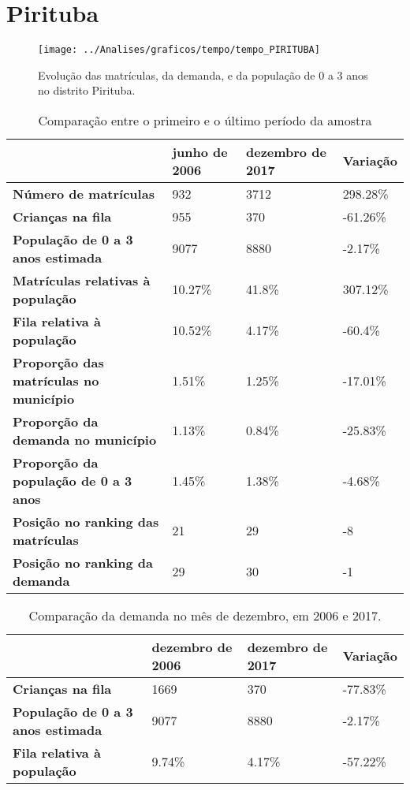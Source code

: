 \section{Pirituba}
\begin{figure}[H]
\centering
\texttt{[image: ../Analises/graficos/tempo/tempo\_PIRITUBA]}
\caption{Evolução das matrículas, da demanda, e da população de 0 a 3 anos no distrito Pirituba.}
\end{figure}
\begin{table}[H]
\begin{tabular}{|l|l|l|l|}
\hline
\textbf{}                                      & \textbf{junho de 2006}       & \textbf{dezembro de 2017}    & \textbf{Variação} \\ \hline
\textbf{Número de matrículas}                  & 932 & 3712 & 298.28\% \\ \hline
\textbf{Crianças na fila}                      & 955 & 370 & -61.26\% \\ \hline
\textbf{População de 0 a 3 anos estimada}      & 9077 & 8880 & -2.17\% \\ \hline
\textbf{Matrículas relativas à população}      & 10.27\% & 41.8\% & 307.12\% \\ \hline
\textbf{Fila relativa à população}             & 10.52\% & 4.17\% & -60.4\% \\ \hline
\textbf{Proporção das matrículas no município} & 1.51\% & 1.25\% & -17.01\% \\ \hline
\textbf{Proporção da demanda no município}     & 1.13\% & 0.84\% & -25.83\% \\ \hline
\textbf{Proporção da população de 0 a 3 anos}  & 1.45\% & 1.38\% & -4.68\% \\ \hline
\textbf{Posição no ranking das matrículas}     & 21 & 29 & -8 \\ \hline
\textbf{Posição no ranking da demanda}         & 29 & 30 & -1 \\ \hline
\end{tabular}
\caption{Comparação entre o primeiro e o último período da amostra}
\end{table}
\begin{table}[H]
\begin{tabular}{|l|l|l|l|}
\hline
\textbf{}                                 & \textbf{dezembro de 2006} & \textbf{dezembro de 2017} & \textbf{Variação} \\ \hline
\textbf{Crianças na fila}                      & 1669 & 370 & -77.83\% \\ \hline
\textbf{População de 0 a 3 anos estimada}      & 9077 & 8880 & -2.17\% \\ \hline
\textbf{Fila relativa à população}             & 9.74\% & 4.17\% & -57.22\% \\ \hline
\end{tabular}
\caption{Comparação da demanda no mês de dezembro, em 2006 e 2017.}
\end{table}
